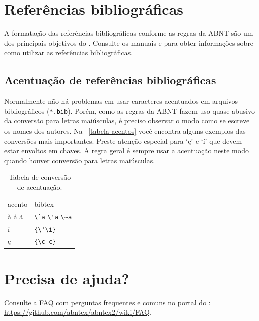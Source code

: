     \section{Referências bibliográficas}

    A formatação das referências bibliográficas conforme as regras da ABNT são um
    dos principais objetivos do \abnTeX. Consulte os manuais
     e  para obter informações
    sobre como utilizar as referências bibliográficas.

    \subsection{Acentuação de referências bibliográficas}

    Normalmente não há problemas em usar caracteres acentuados em arquivos
    bibliográficos (\texttt{*.bib}). Porém, como as regras da ABNT fazem uso quase
    abusivo da conversão para letras maiúsculas, é preciso observar o modo como se
    escreve os nomes dos autores. Na ~\autoref{tabela-acentos} você encontra alguns
    exemplos das conversões mais importantes. Preste atenção especial para `ç' e `í'
    que devem estar envoltos em chaves. A regra geral é sempre usar a acentuação
    neste modo quando houver conversão para letras maiúsculas.

    \begin{table}[htbp]
    \caption{Tabela de conversão de acentuação.}
    \label{tabela-acentos}

    \begin{center}
    \begin{tabular}{ll}\hline\hline
    acento & \textsf{bibtex}\\
    à á ã & \verb+\`a+ \verb+\'a+ \verb+\~a+\\
    í & \verb+{\'\i}+\\
    ç & \verb+{\c c}+\\
    \hline\hline
    \end{tabular}
    \end{center}
    \end{table}


    \section{Precisa de ajuda?}

    Consulte a FAQ com perguntas frequentes e comuns no portal do \abnTeX:
    \url{https://github.com/abntex/abntex2/wiki/FAQ}.


